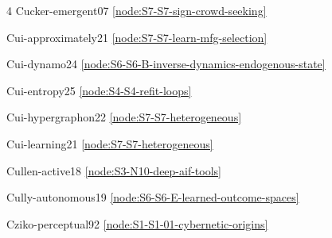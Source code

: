 \documentclass[10pt]{article}
\begin{document}
{\begin{multicols}{4}
Cucker-emergent07 \hfill \ref{node:S7-S7-sign-crowd-seeking}\par
Cui-approximately21 \hfill \ref{node:S7-S7-learn-mfg-selection}\par
Cui-dynamo24 \hfill \ref{node:S6-S6-B-inverse-dynamics-endogenous-state}\par
Cui-entropy25 \hfill \ref{node:S4-S4-refit-loops}\par
Cui-hypergraphon22 \hfill \ref{node:S7-S7-heterogeneous}\par
Cui-learning21 \hfill \ref{node:S7-S7-heterogeneous}\par
Cullen-active18 \hfill \ref{node:S3-N10-deep-aif-tools}\par
Cully-autonomous19 \hfill \ref{node:S6-S6-E-learned-outcome-spaces}\par
Cziko-perceptual92 \hfill \ref{node:S1-S1-01-cybernetic-origins}\par


\end{multicols}}
\end{document}
